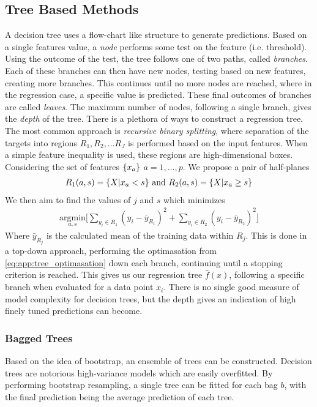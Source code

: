         \subsection{Tree Based Methods}
            A decision tree uses a flow-chart like structure to generate predictions. Based on a single features value, a \textit{node} performs some test on the feature (i.e. threshold). Using the outcome of the test, the tree follows one of two paths, called \textit{branches}. Each of these branches can then have new nodes, testing based on new features, creating more branches. This continues until no more nodes are reached, where in the regression case, a specific value is predicted. These final outcomes of branches are called \textit{leaves}. The maximum number of nodes, following a single branch, gives the \textit{depth} of the tree. 
            There is a plethora of ways to construct a regression tree. The most common approach is \textit{recursive binary splitting}, where separation of the targets into regions $R_1, R_2, \ldots R_J$ is performed based on the input features. When a simple feature inequality is used, these regions are high-dimensional boxes. Considering the set of features $\{x_a\}$ $a = 1,\ldots,p$. We propose a pair of half-planes 
            \begin{align*}
                R_1(a,s) = \{X | x_a < s\} \text{ and } R_2(a,s) = \{X | x_a \geq s\}
            \end{align*}
            We then aim to find the values of $j$ and $s$ which minimizes
            \begin{align}
                \underset{a,s}{\text{argmin}}\Bigg[ \sum_{y_i \in R_1} (y_i - \bar{y}_{R_1})^2 + \sum_{y_i \in R_2} (y_i - \bar{y}_{R_2})^2 \Bigg] \label{eq:app:tree_optimasation} 
            \end{align}
            Where $\bar{y}_{R_j}$ is the calculated mean of the training data within $R_j$. This is done in a top-down approach, performing the optimasation from \cref{eq:app:tree_optimasation} down each branch, continuing until a stopping criterion is reached. This gives us our regression tree $\hat{f}(x)$, following a specific branch when evaluated for a data point $x_i$. There is no single good measure of model complexity for decision trees, but the depth gives an indication of high finely tuned predictions can become.    

            \subsubsection{Bagged Trees}
            Based on the idea of bootstrap, an ensemble of trees can be constructed. Decision trees are notorious high-variance models which are easily overfitted. By performing bootstrap resampling, a single tree can be fitted for each bag $b$, with the final prediction being the average prediction of each tree.

